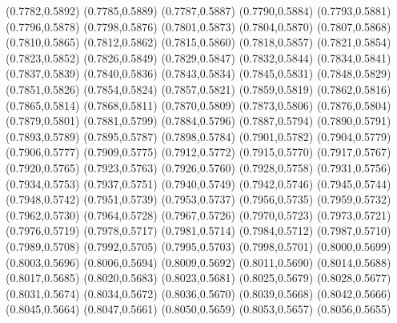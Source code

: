 \PST@Cross(0.7782,0.5892)
\PST@Cross(0.7785,0.5889)
\PST@Cross(0.7787,0.5887)
\PST@Cross(0.7790,0.5884)
\PST@Cross(0.7793,0.5881)
\PST@Cross(0.7796,0.5878)
\PST@Cross(0.7798,0.5876)
\PST@Cross(0.7801,0.5873)
\PST@Cross(0.7804,0.5870)
\PST@Cross(0.7807,0.5868)
\PST@Cross(0.7810,0.5865)
\PST@Cross(0.7812,0.5862)
\PST@Cross(0.7815,0.5860)
\PST@Cross(0.7818,0.5857)
\PST@Cross(0.7821,0.5854)
\PST@Cross(0.7823,0.5852)
\PST@Cross(0.7826,0.5849)
\PST@Cross(0.7829,0.5847)
\PST@Cross(0.7832,0.5844)
\PST@Cross(0.7834,0.5841)
\PST@Cross(0.7837,0.5839)
\PST@Cross(0.7840,0.5836)
\PST@Cross(0.7843,0.5834)
\PST@Cross(0.7845,0.5831)
\PST@Cross(0.7848,0.5829)
\PST@Cross(0.7851,0.5826)
\PST@Cross(0.7854,0.5824)
\PST@Cross(0.7857,0.5821)
\PST@Cross(0.7859,0.5819)
\PST@Cross(0.7862,0.5816)
\PST@Cross(0.7865,0.5814)
\PST@Cross(0.7868,0.5811)
\PST@Cross(0.7870,0.5809)
\PST@Cross(0.7873,0.5806)
\PST@Cross(0.7876,0.5804)
\PST@Cross(0.7879,0.5801)
\PST@Cross(0.7881,0.5799)
\PST@Cross(0.7884,0.5796)
\PST@Cross(0.7887,0.5794)
\PST@Cross(0.7890,0.5791)
\PST@Cross(0.7893,0.5789)
\PST@Cross(0.7895,0.5787)
\PST@Cross(0.7898,0.5784)
\PST@Cross(0.7901,0.5782)
\PST@Cross(0.7904,0.5779)
\PST@Cross(0.7906,0.5777)
\PST@Cross(0.7909,0.5775)
\PST@Cross(0.7912,0.5772)
\PST@Cross(0.7915,0.5770)
\PST@Cross(0.7917,0.5767)
\PST@Cross(0.7920,0.5765)
\PST@Cross(0.7923,0.5763)
\PST@Cross(0.7926,0.5760)
\PST@Cross(0.7928,0.5758)
\PST@Cross(0.7931,0.5756)
\PST@Cross(0.7934,0.5753)
\PST@Cross(0.7937,0.5751)
\PST@Cross(0.7940,0.5749)
\PST@Cross(0.7942,0.5746)
\PST@Cross(0.7945,0.5744)
\PST@Cross(0.7948,0.5742)
\PST@Cross(0.7951,0.5739)
\PST@Cross(0.7953,0.5737)
\PST@Cross(0.7956,0.5735)
\PST@Cross(0.7959,0.5732)
\PST@Cross(0.7962,0.5730)
\PST@Cross(0.7964,0.5728)
\PST@Cross(0.7967,0.5726)
\PST@Cross(0.7970,0.5723)
\PST@Cross(0.7973,0.5721)
\PST@Cross(0.7976,0.5719)
\PST@Cross(0.7978,0.5717)
\PST@Cross(0.7981,0.5714)
\PST@Cross(0.7984,0.5712)
\PST@Cross(0.7987,0.5710)
\PST@Cross(0.7989,0.5708)
\PST@Cross(0.7992,0.5705)
\PST@Cross(0.7995,0.5703)
\PST@Cross(0.7998,0.5701)
\PST@Cross(0.8000,0.5699)
\PST@Cross(0.8003,0.5696)
\PST@Cross(0.8006,0.5694)
\PST@Cross(0.8009,0.5692)
\PST@Cross(0.8011,0.5690)
\PST@Cross(0.8014,0.5688)
\PST@Cross(0.8017,0.5685)
\PST@Cross(0.8020,0.5683)
\PST@Cross(0.8023,0.5681)
\PST@Cross(0.8025,0.5679)
\PST@Cross(0.8028,0.5677)
\PST@Cross(0.8031,0.5674)
\PST@Cross(0.8034,0.5672)
\PST@Cross(0.8036,0.5670)
\PST@Cross(0.8039,0.5668)
\PST@Cross(0.8042,0.5666)
\PST@Cross(0.8045,0.5664)
\PST@Cross(0.8047,0.5661)
\PST@Cross(0.8050,0.5659)
\PST@Cross(0.8053,0.5657)
\PST@Cross(0.8056,0.5655)
